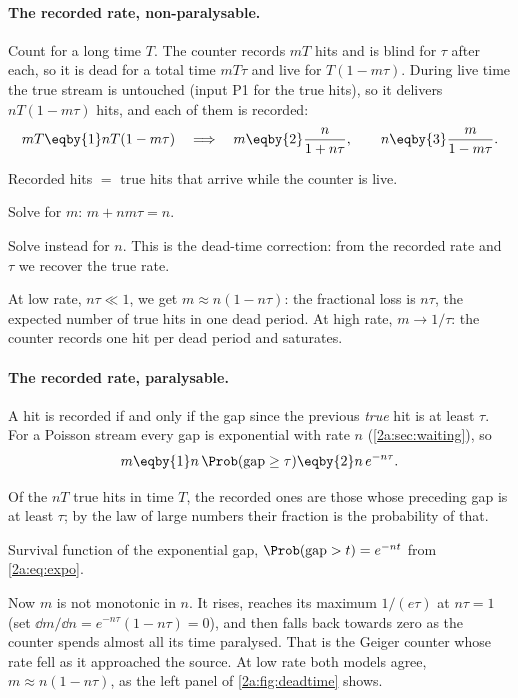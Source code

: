 \paragraph{The recorded rate, non-paralysable.} Count for a long time $T$. The counter records $mT$ hits and is blind for $\tau$ after each, so it is dead for a total time $mT\tau$ and live for $T(1-m\tau)$. During live time the true stream is untouched (input P1 for the true hits), so it delivers $nT(1-m\tau)$ hits, and each of them is recorded:
\begin{align}
  mT \eqby{1} nT(1-m\tau)
  \quad\Longrightarrow\quad
  m\eqby{2}\frac{n}{1+n\tau},
  \qquad
  n\eqby{3}\frac{m}{1-m\tau}. \label{2a:eq:dtnp}
\end{align}
\begin{explain}
  \item Recorded hits $=$ true hits that arrive while the counter is live.
  \item Solve for $m$: $m+nm\tau=n$.
  \item Solve instead for $n$. This is the dead-time correction: from the recorded rate and $\tau$ we recover the true rate.
\end{explain}
At low rate, $n\tau\ll1$, we get $m\approx n(1-n\tau)$: the fractional loss is $n\tau$, the expected number of true hits in one dead period. At high rate, $m\to1/\tau$: the counter records one hit per dead period and saturates.

\paragraph{The recorded rate, paralysable.} A hit is recorded if and only if the gap since the previous \emph{true} hit is at least $\tau$. For a Poisson stream every gap is exponential with rate $n$ (\cref{2a:sec:waiting}), so
\begin{align}
  m \eqby{1} n\,\Prob(\text{gap}\ge\tau) \eqby{2} n\,e^{-n\tau}. \label{2a:eq:dtp}
\end{align}
\begin{explain}
  \item Of the $nT$ true hits in time $T$, the recorded ones are those whose preceding gap is at least $\tau$; by the law of large numbers their fraction is the probability of that.
  \item Survival function of the exponential gap, $\Prob(\text{gap}>t)=e^{-nt}$ from \eqref{2a:eq:expo}.
\end{explain}
Now $m$ is not monotonic in $n$. It rises, reaches its maximum $1/(e\tau)$ at $n\tau=1$ (set $\dd m/\dd n=e^{-n\tau}(1-n\tau)=0$), and then falls back towards zero as the counter spends almost all its time paralysed. That is the Geiger counter whose rate fell as it approached the source. At low rate both models agree, $m\approx n(1-n\tau)$, as the left panel of \cref{2a:fig:deadtime} shows.

